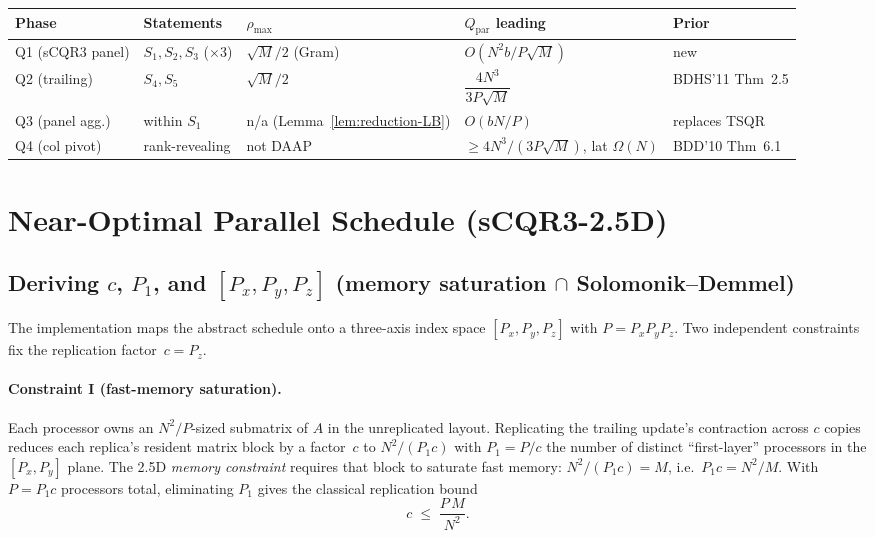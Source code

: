 \documentclass[11pt]{article}
\begin{document}
\begin{center}\footnotesize
\setlength{\tabcolsep}{3pt}
\begin{tabular}{@{}lllll@{}}
\toprule
Phase & Statements & $\rho_{\max}$ & $Q_{\text{par}}$ leading & Prior \\
\midrule
Q1 (sCQR3 panel)    & $S_1, S_2, S_3$ ($\times 3$)  & $\sqrt{M}/2$ (Gram)  & $O(N^2 b / P\sqrt M)$                    & new          \\
Q2 (trailing)        & $S_4, S_5$                    & $\sqrt{M}/2$          & $\dfrac{4 N^3}{3 P \sqrt M}$             & BDHS'11 Thm~2.5 \\
Q3 (panel agg.)      & within $S_1$                  & n/a (Lemma~\ref{lem:reduction-LB})  & $O(bN/P)$                                & replaces TSQR \\
Q4 (col pivot)       & rank-revealing                & not DAAP              & $\ge 4N^3/(3P\sqrt M)$, lat $\Omega(N)$  & BDD'10 Thm~6.1 \\
\bottomrule
\end{tabular}
\end{center}

\section{Near-Optimal Parallel Schedule (sCQR3-2.5D)}
\label{sec:A3}

\subsection{Deriving $c$, $P_1$, and $[P_x,P_y,P_z]$ (memory saturation $\cap$ Solomonik--Demmel)}
\label{sec:A3derive}

The implementation maps the abstract schedule onto a three-axis index
space $[P_x,P_y,P_z]$ with $P = P_x P_y P_z$.  Two independent
constraints fix the replication factor~$c = P_z$.

\paragraph{Constraint I (fast-memory saturation).}
Each processor owns an $N^2/P$-sized submatrix of $A$ in the
unreplicated layout.  Replicating the trailing update's contraction
across $c$ copies reduces each replica's resident matrix block by a
factor~$c$ to $N^2/(P_1 c)$ with $P_1 = P/c$ the number of distinct
``first-layer'' processors in the $[P_x,P_y]$ plane.  The 2.5D
\emph{memory constraint} requires that block to saturate fast memory:
$N^2/(P_1 c) = M$, i.e.\ $P_1 c = N^2/M$.  With $P = P_1 c$ processors
total, eliminating $P_1$ gives the classical replication bound
\begin{equation}
  c \;\le\; \frac{P\,M}{N^2}.
  \label{eq:c-memory}
\end{equation}
\end{document}
